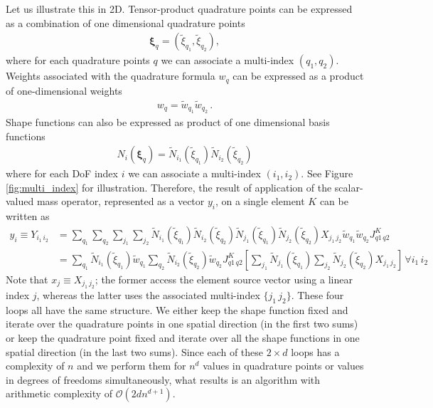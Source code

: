 \documentclass[preprint,12pt,times]{elsarticle}
\def\gz  #1{           \mbox{$\boldsymbol{#1}$}}
\begin{document}
Let us illustrate this in 2D. Tensor-product quadrature points can be expressed as a combination of one dimensional quadrature points
\begin{align}
  \gz \xi_q = (\widetilde{\xi}_{q_1}, \widetilde{\xi}_{q_2}),
\end{align}
where for each quadrature points $q$ we can associate a multi-index $(q_1,q_2)$.
Weights associated with the quadrature formula $w_q$ can be expressed as a product of one-dimensional weights
\begin{align}
  w_q = \widetilde{w}_{q_1} \widetilde{w}_{q_2} \, .
\end{align}
Shape functions can also be expressed as product of one dimensional basis functions
\begin{align}
  N_i(\gz \xi_q) =
  \widetilde{N}_{i_1}(\widetilde{\xi}_{q_1})
  \widetilde{N}_{i_2}(\widetilde{\xi}_{q_2})
\end{align}
where for each DoF index $i$ we can associate a multi-index $(i_1, i_2)$.
See Figure \ref{fig:multi_index} for illustration.
%
Therefore, the result of application of the scalar-valued mass operator, represented as a vector $y_i$, on a single element $K$ can be written as
\begin{align*}
  y_{i} \equiv Y_{i_1\,i_2} & = \sum_{q_1} \sum_{q_2} \sum_{j_1} \sum_{j_2}
  \widetilde{N}_{i_1}(\widetilde{\xi}_{q_1})
  \widetilde{N}_{i_2}(\widetilde{\xi}_{q_2})
  \widetilde{N}_{j_1}(\widetilde{\xi}_{q_1})
  \widetilde{N}_{j_2}(\widetilde{\xi}_{q_2})
  X_{j_1\,j_2}
  \widetilde{w}_{q_1} \widetilde{w}_{q_2} J^K_{q1\,q2}
  \\
  &=
  \sum_{q_1} \widetilde{N}_{i_1}(\widetilde{\xi}_{q_1}) \widetilde{w}_{q_1}
  \sum_{q_2} \widetilde{N}_{i_2}(\widetilde{\xi}_{q_2}) \widetilde{w}_{q_2}
  J^K_{q1\,q2}
  \left[
    \sum_{j_1}
    \widetilde{N}_{j_1}(\widetilde{\xi}_{q_1})
    \sum_{j_2}
    \widetilde{N}_{j_2}(\widetilde{\xi}_{q_2})
    X_{j_1\,j_2}
  \right]\, \forall i_1 \, i_2
\end{align*}
%
Note that $x_j \equiv X_{j_1\,j_2}$; the former access the element source vector using a linear index $j$, whereas the latter uses the associated multi-index $\{j_1\,j_2\}$.
%
These four loops all have the same structure.
We either keep the shape function fixed and iterate over the quadrature points in one spatial direction (in the first two sums) or keep the quadrature point fixed and iterate over all the shape functions in one spatial direction (in the last two sums).
Since each of these $2\times d$ loops has a complexity of $n$ and we perform them for $n^d$ values in quadrature points or values in degrees of freedoms simultaneously, what results is an algorithm with arithmetic complexity of $\mathcal{O}(2dn^{d+1})$.
\end{document}
